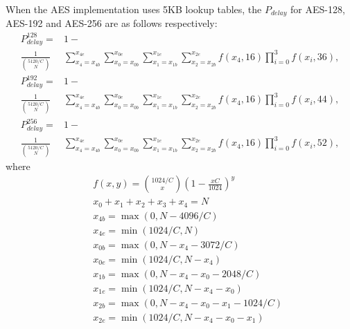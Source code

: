 When the AES implementation uses 5KB lookup tables, the $P_{delay}$ for AES-128, AES-192 and AES-256 are as follows respectively:
\begin{align}
    P_{delay}^{128} = &1-   \nonumber \\
    \frac{1}{\binom{5120/C}{N}}&\sum_{x_4=x_{4b}}^{x_{4e}}{\sum_{x_0=x_{0b}}^{x_{0e}}{\sum_{x_1=x_{1b}}^{x_{1e}}{ \sum_{x_2=x_{2b}}^{x_{2e}}{f(x_4,16)\prod_{i=0}^{3}{f(x_i,36)}}}}},
\end{align}
\begin{align}
    P_{delay}^{192} = &1-  \nonumber \\
    \frac{1}{\binom{5120/C}{N}}&\sum_{x_4=x_{4b}}^{x_{4e}}{\sum_{x_0=x_{0b}}^{x_{0e}}{\sum_{x_1=x_{1b}}^{x_{1e}}{ \sum_{x_2=x_{2b}}^{x_{2e}}{f(x_4,16)\prod_{i=0}^{3}{f(x_i,44)}}}}},
\end{align}
\begin{align}
    P_{delay}^{256} = &1-  \nonumber \\
    \frac{1}{\binom{5120/C}{N}}&\sum_{x_4=x_{4b}}^{x_{4e}}{\sum_{x_0=x_{0b}}^{x_{0e}}{\sum_{x_1=x_{1b}}^{x_{1e}}{ \sum_{x_2=x_{2b}}^{x_{2e}}{f(x_4,16)\prod_{i=0}^{3}{f(x_i,52)}}}}},
\end{align}
where
  \begin{eqnarray*}
    &&f(x,y) = \binom{1024/C}{x}(1-\frac{xC}{1024})^{y} \\
    &&x_0+x_1+x_2+x_3+x_4 = N \\
    &&x_{4b} = \max(0,N-4096/C) \\
    &&x_{4e} = \min(1024/C,N) \\
    &&x_{0b} = \max(0,N-x_4-3072/C) \\
    &&x_{0e} = \min(1024/C,N-x_4) \\
    &&x_{1b} = \max(0,N-x_4-x_0-2048/C) \\
    &&x_{1e} = \min(1024/C,N-x_4-x_0) \\
    &&x_{2b} = \max(0,N-x_4-x_0-x_1-1024/C) \\
    &&x_{2e} = \min(1024/C,N-x_4-x_0-x_1)
  \end{eqnarray*}

